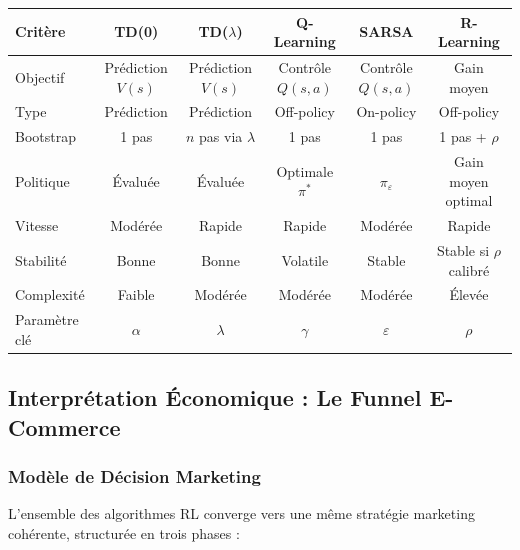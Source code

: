 \documentclass[11pt,a4paper]{article}
\begin{document}
\begin{center}
\begin{tabular}{p{1.2cm}ccccc}
\toprule
\rowcolor{LightBlue}
\textbf{Critère}
& \textbf{TD(0)}
& \textbf{TD($\lambda$)}
& \textbf{Q-Learning}
& \textbf{SARSA}
& \textbf{R-Learning}
\\
\midrule

Objectif
& Prédiction $V(s)$
& Prédiction $V(s)$
& Contrôle $Q(s,a)$
& Contrôle $Q(s,a)$
& Gain moyen
\\

Type
& Prédiction
& Prédiction
& Off-policy
& On-policy
& Off-policy
\\

Bootstrap
& 1 pas
& $n$ pas via $\lambda$
& 1 pas
& 1 pas
& 1 pas + $\rho$
\\

Politique
& Évaluée
& Évaluée
& Optimale $\pi^*$
& $\pi_\varepsilon$
& Gain moyen optimal
\\

Vitesse
& Modérée
& Rapide
& Rapide
& Modérée
& Rapide
\\

Stabilité
& Bonne
& Bonne
& Volatile
& Stable
& Stable si $\rho$ calibré
\\

Complexité
& Faible
& Modérée
& Modérée
& Modérée
& Élevée
\\

Paramètre clé
& $\alpha$
& $\lambda$
& $\gamma$
& $\varepsilon$
& $\rho$
\\

\bottomrule
\end{tabular}
\end{center}


\subsection{Interprétation Économique : Le Funnel E-Commerce}

\subsubsection{Modèle de Décision Marketing}

L'ensemble des algorithmes RL converge vers une même stratégie marketing cohérente, structurée en trois phases :
\end{document}
